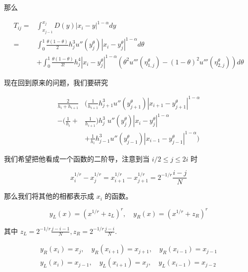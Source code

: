 \documentclass{ctexart}
\begin{document}
那么



\begin{equation}
    \begin{aligned}
        T_{ij} = & \int_{x_{j-1}}^{x_{j}} D(y) |x_i - y|^{1-\alpha} dy                                                                                                               \\
        =        & \int_0^1 \frac{\theta (1-\theta)}{2} h_j^{3} u''(y_j^\theta) |x_i - y_j^\theta|^{1-\alpha} d\theta                                                                \\
                 & + \int_0^1 \frac{\theta (1-\theta)}{3!} h_j^{4}  |x_i - y_j^\theta|^{1-\alpha} (\theta^2 u'''(\eta_{1,j}^\theta) -  (1-\theta)^2 u'''(\eta_{2,j}^\theta)) d\theta
    \end{aligned}
\end{equation}

现在回到原来的问题，我们要研究

\begin{equation}
    \begin{aligned}
        \frac{2}{h_i + h_{i+1}}
                             & ( \frac{1}{h_{i+1}}  h_{j+1}^{3} u''(y_{j+1}^\theta) |x_{i+1} - y_{j+1}^\theta|^{1-\alpha} \\
        - (\frac{1}{h_{i}} + & \frac{1}{h_{i+1}}) h_j^{3} \; u''(y_j^\theta) |x_i - y_j^\theta|^{1-\alpha}                \\
                             & +  \frac{1}{h_{i}} h_{j-1}^{3} u''(y_{j-1}^\theta) |x_{i-1} - y_{j-1}^\theta|^{1-\alpha} )
    \end{aligned}
\end{equation}

我们希望把他看成一个函数的二阶导，注意到当 \(i/2 \le j \le 2i\) 时

\begin{equation}
    x_i^{1/r} - x_j^{1/r} = x_{i+1}^{1/r} - x_{j+1}^{1/r} = 2^{-1/r}\frac{i-j}{N}
\end{equation}

那么我们将其他的相都表示成 \(x_i\) 的函数。

\begin{equation}
    y_L(x) = (x^{1/r} + z_L)^r , \quad y_R(x) =  (x^{1/r} + z_R)^r
\end{equation}

其中 \(z_L = 2^{-1/r}\frac{j-i-1}{N}, z_R = 2^{-1/r}\frac{j-i}{N}\).

\begin{gather}
    y_R(x_i)=x_j, \quad y_R(x_{i+1}) = x_{j+1}, \quad y_R(x_{i-1}) = x_{j-1} \\
    y_L(x_i) = x_{j-1} ,\quad y_L(x_{i+1}) = x_{j}, \quad y_L(x_{i-1}) = x_{j-2}
\end{gather}
\end{document}
